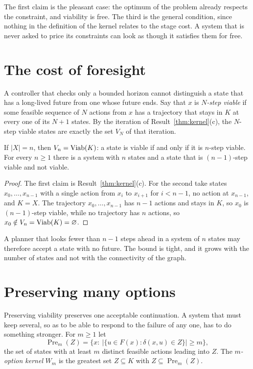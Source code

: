 The first claim is the pleasant case: the optimum of the problem already respects the constraint, and viability is free. The third is the general condition, since nothing in the definition of the kernel relates to the stage cost. A system that is never asked to price its constraints can look as though it satisfies them for free.

\section{The cost of foresight}

A controller that checks only a bounded horizon cannot distinguish a state that has a long-lived future from one whose future ends. Say that $x$ is \emph{$N$-step viable} if some feasible sequence of $N$ actions from $x$ has a trajectory that stays in $K$ at every one of its $N+1$ states. By the iteration of Result~\ref{thm:kernel}(c), the $N$-step viable states are exactly the set $V_N$ of that iteration.

\begin{newresult}\label{prop:lookahead}
If $|X|=n$, then $V_{n}=\operatorname{Viab}(K)$: a state is viable if and only if it is $n$-step viable. For every $n\ge1$ there is a system with $n$ states and a state that is $(n-1)$-step viable and not viable.
\end{newresult}
\begin{proof}
The first claim is Result~\ref{thm:kernel}(c). For the second take states $x_0,\dots,x_{n-1}$ with a single action from $x_i$ to $x_{i+1}$ for $i<n-1$, no action at $x_{n-1}$, and $K=X$. The trajectory $x_0,\dots,x_{n-1}$ has $n-1$ actions and stays in $K$, so $x_0$ is $(n-1)$-step viable, while no trajectory has $n$ actions, so $x_0\notin V_n=\operatorname{Viab}(K)=\varnothing$.
\end{proof}

A planner that looks fewer than $n-1$ steps ahead in a system of $n$ states may therefore accept a state with no future. The bound is tight, and it grows with the number of states and not with the connectivity of the graph.

\section{Preserving many options}

Preserving viability preserves one acceptable continuation. A system that must keep several, so as to be able to respond to the failure of any one, has to do something stronger. For $m\ge1$ let
\[
\operatorname{Pre}_m(Z)=\bigl\{x:\ \bigl|\{u\in F(x):\delta(x,u)\in Z\}\bigr|\ge m\bigr\},
\]
the set of states with at least $m$ distinct feasible actions leading into $Z$. The \emph{$m$-option kernel} $W_m$ is the greatest set $Z\subseteq K$ with $Z\subseteq\operatorname{Pre}_m(Z)$.

